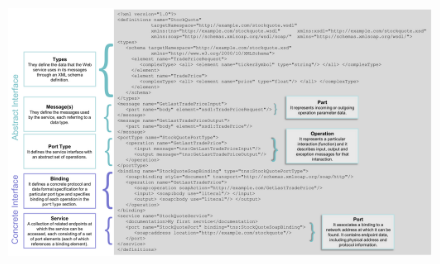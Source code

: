 \documentclass[oneside]{article}
\begin{document}
\begin{figure}[!htb]
    {\includegraphics[width=\textwidth]
    {WSDL_elements.png}}
\end{figure}





\newpage
\end{document}

